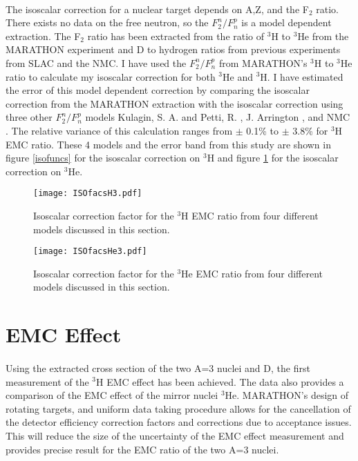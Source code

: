 	\paragraph{}The isoscalar correction for a nuclear target depends on A,Z, and the F$_2$ ratio. There exists no data on the free neutron, so the $F^n_2/F^p_n$ is a model dependent extraction. The  F$_2$ ratio has been extracted from the ratio of $^3$H to $^3$He from the MARATHON experiment and D to hydrogen ratios from previous experiments from SLAC and the NMC. I have used the $F^n_2/F^p_n$ from MARATHON's $^3$H to $^3$He ratio to calculate my isoscalar correction for both $^3$He and $^3$H. I have estimated the error of this model dependent correction by comparing the isoscalar correction from the MARATHON extraction with the isoscalar correction using three other $F^n_2/F^p_n$ models Kulagin, S. A. and Petti, R. \cite{kpmodel}, J. Arrington \cite{JA_FR}, and NMC \cite{NMC_ratio}. The relative variance of this calculation ranges from $\pm$ 0.1\% to $\pm$ 3.8\% for $^3$H EMC ratio. These 4 models and the error band from this study are shown in figure \ref{isofuncs} for the isoscalar correction on $^3$H and figure \ref{isofuncsHe3} for the isoscalar correction on $^3$He.

	\begin{figure}[]
		\texttt{[image: ISOfacsH3.pdf]}
		\caption{Isoscalar correction factor for the $^3$H EMC ratio from four different models discussed in this section.}
		\label{isofuncs}
		\vspace{1cm}
		\texttt{[image: ISOfacsHe3.pdf]}
		\caption{Isoscalar correction factor for the $^3$He EMC ratio from four different models discussed in this section.}
		\label{isofuncsHe3}
	\end{figure}

\section{EMC Effect}
\paragraph{} Using the extracted cross section of the two A=3 nuclei and D, the first measurement of the $^3$H EMC effect has been achieved. The data also provides a comparison of the EMC effect of the mirror nuclei $^3$He. MARATHON's design of rotating targets, and uniform data taking procedure allows for the cancellation of the detector efficiency correction factors and corrections due to acceptance issues. This will reduce the size of the uncertainty of the EMC effect measurement and provides precise result for the EMC ratio of the two A=3 nuclei. 
